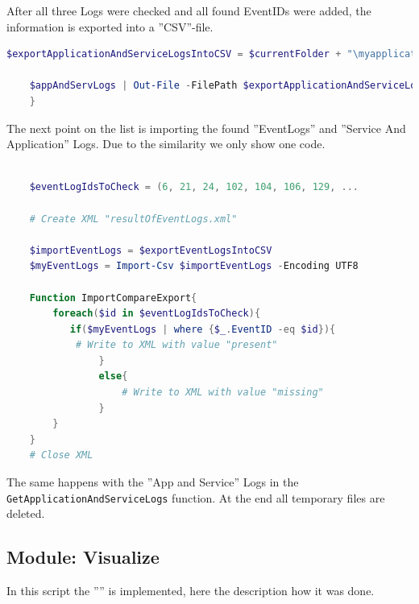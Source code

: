 \clearpage
After all three Logs were checked and all found EventIDs were added, the information is exported into a ''CSV''-file.
\begin{lstlisting}[caption=Function GetApplicationAndServiceLogs Part 2, language=PowerShell]
    $exportApplicationAndServiceLogsIntoCSV = $currentFolder + "\myapplicationandservicelogs.csv"

    $appAndServLogs | Out-File -FilePath $exportApplicationAndServiceLogsIntoCSV
    }
\end{lstlisting}
The next point on the list is importing the found ''EventLogs'' and ''Service And Application'' Logs. Due to the similarity we only show one code.
\begin{lstlisting}[caption=Function ImportCompareExport, language=PowerShell]
    
    $eventLogIdsToCheck = (6, 21, 24, 102, 104, 106, 129, ...

    # Create XML "resultOfEventLogs.xml"

    $importEventLogs = $exportEventLogsIntoCSV
    $myEventLogs = Import-Csv $importEventLogs -Encoding UTF8

    Function ImportCompareExport{
        foreach($id in $eventLogIdsToCheck){
           if($myEventLogs | where {$_.EventID -eq $id}){
            # Write to XML with value "present"
                }
                else{
                    # Write to XML with value "missing"
                }
        }
    }
    # Close XML
\end{lstlisting}
The same happens with the ''App and Service'' Logs in the \lstinline|GetApplicationAndServiceLogs| function. At the end all temporary files are deleted.
\clearpage
\subsection{Module: Visualize}
In this script the '''' is implemented, here the description how it was done.
